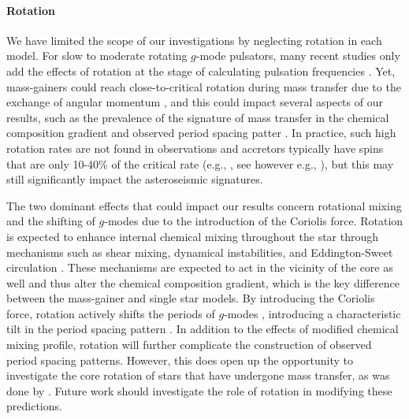 \documentclass[desactivate]{aa}
\newcommand{\referee}[1]{{#1}}
\begin{document}


\paragraph{Rotation} We have limited the scope of our investigations by neglecting rotation in each model. For slow to moderate rotating $g$-mode pulsators, many recent studies only add the effects of rotation at the stage of calculating pulsation frequencies \citep[e.g.][]{Michielsen+2021}. Yet, mass-gainers could reach close-to-critical rotation during mass transfer due to the exchange of angular momentum \citep{Packet+1981, deMink+2013:2013ApJ...764..166D, Renzo+2021}, and this could impact several aspects of our results\referee{, such as the prevalence of the signature of mass transfer in the chemical composition gradient and observed period spacing patter} \citep[e.g.][and references therein]{Aerts+2023:2023arXiv231108453A}. In practice, such high rotation rates are not found in observations and accretors typically have spins that are only 10-40\% of the critical rate (e.g., \citealp{Dervisoglu+2010}, see however e.g., \citealp{Zehe+2018:2018AN....339...46Z}), but this may still significantly impact the asteroseismic signatures.

The two dominant effects \referee{that could impact our results} concern rotational mixing and the shifting of $g$-modes due to the introduction of the Coriolis force. Rotation is expected to enhance internal chemical mixing throughout the star through mechanisms such as shear mixing, dynamical instabilities, and Eddington-Sweet circulation \citep{Maeder2000}. These mechanisms are expected to act in the vicinity of the core as well and thus alter the chemical composition gradient, which is the key difference between the mass-gainer and single star models. By introducing the Coriolis force, rotation actively shifts the periods of $g$-modes \citep{Townsend2003}, introducing a characteristic tilt in the period spacing pattern \citep{Bouabid+2013}. In addition to the effects of modified chemical mixing profile, rotation will further complicate the construction of observed period spacing patterns. However, this does open up the opportunity to investigate the core rotation of stars that have undergone mass transfer, as was done by \citet{Guo2019}. Future work should investigate the role of rotation in modifying these predictions.
\end{document}
